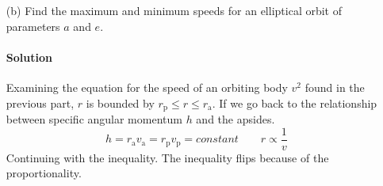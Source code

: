 \documentclass{article}
\begin{document}
{\begin{enumerate}
		\begin{equation*}
			\begin{split}
				E &= \frac{1}{2} m\left( \frac{GM(1-e)}{a(1+e)} \right) - \frac{GMm}{r_\mathrm{a}} = GMm\left( \frac{(1-e)}{2a(1+e)} - \frac{1}{a(1+e)} \right) \\
				E &= \frac{GMm}{a(1+e)}\left( \frac{(1-e)}{2} - 1 \right) \\
				E &= \frac{GMm}{2a(1+e)}(-1-e) \\
				E &= -\frac{GMm}{2a(1+e)}(1+e) \\
				E &= -\frac{GMm}{2a} \\
			\end{split}
		\end{equation*}
		We get the same equation for total energy $E$ if considered from periapsis.
		
		\clearpage
		
		Now to find the other equation using the conservation of mechanical energy equation and the derived total energy of an orbit.
		\begin{equation*}
			\begin{split}
				E &= \frac{1}{2} mv^2 - \frac{GMm}{r} \\
				v^2 &= \frac{2GM}{r} + \frac{2E}{m} = \frac{2GM}{r} + \frac{2}{m} \left( -\frac{GMm}{2a} \right) \\
				v^2 &= \frac{2GM}{r} - \frac{GM}{a} \\
				v^2 &= GM\left( \frac{2}{r} - \frac{1}{a} \right) \\
			\end{split}
		\end{equation*}
			
	
		\item[(b)] Find the maximum and minimum speeds for an elliptical orbit of parameters $a$ and $e$.
		
		
		\paragraph{Solution} Examining the equation for the speed of an orbiting body $v^2$ found in the previous part, $r$ is bounded by $r_\mathrm{p} \leq r \leq r_\mathrm{a}$. If we go back to the relationship between specific angular momentum $h$ and the apsides. \\
		\[
			h = r_\mathrm{a} v_\mathrm{a} = r_\mathrm{p} v_\mathrm{p} = constant \qquad r \propto \frac{1}{v}
		\]
		Continuing with the inequality. The inequality flips because of the proportionality.
		

\end{enumerate}}
\end{document}

